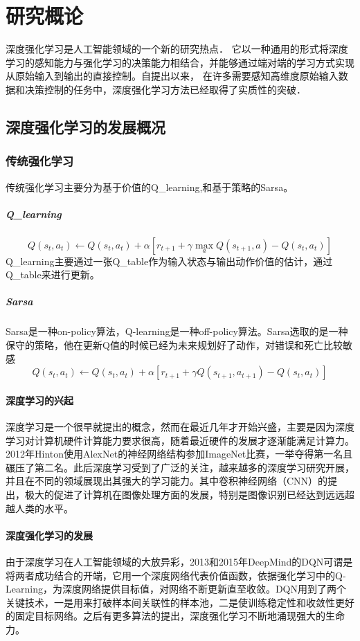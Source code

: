 \chapter{研究概论}
深度强化学习是人工智能领域的一个新的研究热点． 它以一种通用的形式将深度学习的感知能力与强化学习的决策能力相结合，并能够通过端对端的学习方式实现从原始输入到输出的直接控制。自提出以来， 在许多需要感知高维度原始输入数据和决策控制的任务中，深度强化学习方法已经取得了实质性的突破．
\section{深度强化学习的发展概况
}
\subsection{传统强化学习}
传统强化学习主要分为基于价值的Q\_learning,和基于策略的Sarsa。
\paragraph{Q\_learning}
$$
Q\left(s_{t}, a_{t}\right) \leftarrow Q\left(s_{t}, a_{t}\right)+\alpha\left[r_{t+1}+\gamma \max _{a} Q\left(s_{t+1}, a\right)-Q\left(s_{t}, a_{t}\right)\right]
$$
Q\_learning主要通过一张Q\_table作为输入状态与输出动作价值的估计，通过Q\_table来进行更新。
\paragraph{Sarsa}
Sarsa是一种on-policy算法，Q-learning是一种off-policy算法。Sarsa选取的是一种保守的策略，他在更新Q值的时候已经为未来规划好了动作，对错误和死亡比较敏感
$$
Q\left(s_{t}, a_{t}\right) \leftarrow Q\left(s_{t}, a_{t}\right)+\alpha\left[r_{t+1}+\gamma Q\left(s_{t+1}, a_{t+1}\right)-Q\left(s_{t}, a_{t}\right)\right]
$$
\subsubsection{深度学习的兴起}
深度学习是一个很早就提出的概念，然而在最近几年才开始兴盛，主要是因为深度学习对计算机硬件计算能力要求很高，随着最近硬件的发展才逐渐能满足计算力。2012年Hinton使用AlexNet的神经网络结构参加ImageNet比赛，一举夺得第一名且碾压了第二名。此后深度学习受到了广泛的关注，越来越多的深度学习研究开展，并且在不同的领域展现出其强大的学习能力。其中卷积神经网络（CNN）的提出，极大的促进了计算机在图像处理方面的发展，特别是图像识别已经达到远远超越人类的水平。
\subsubsection{深度强化学习的发展}
由于深度学习在人工智能领域的大放异彩，2013和2015年DeepMind的DQN可谓是将两者成功结合的开端，它用一个深度网络代表价值函数，依据强化学习中的Q-Learning，为深度网络提供目标值，对网络不断更新直至收敛。DQN用到了两个关键技术，一是用来打破样本间关联性的样本池，二是使训练稳定性和收敛性更好的固定目标网络。之后有更多算法的提出，深度强化学习不断地涌现强大的生命力。
